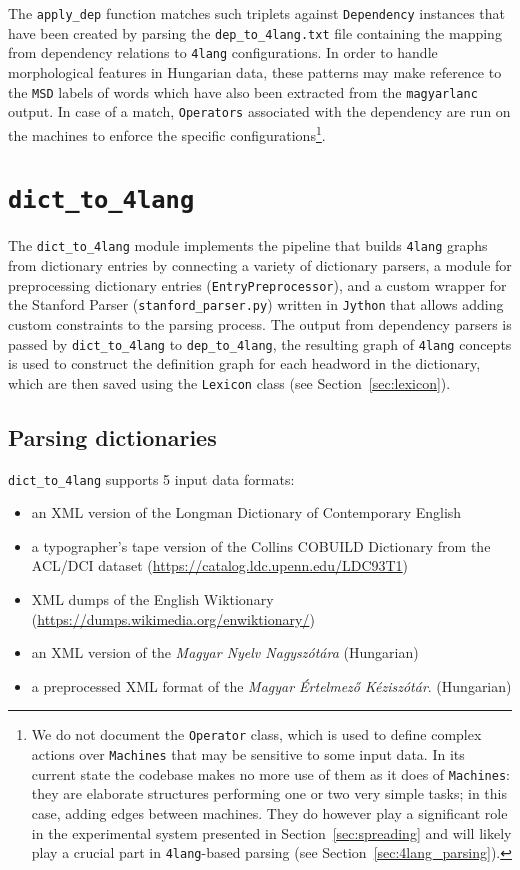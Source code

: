 \documentclass{article}
\newcommand{\defl}{\texttt{dep\_to\_4lang}\xspace}
\newcommand{\difl}{\texttt{dict\_to\_4lang}\xspace}
\newcommand{\fl}{\texttt{4lang}\xspace}
\begin{document}
The \texttt{apply\_dep} function matches such triplets against
\texttt{Dependency} instances that have been created by parsing the
\texttt{dep\_to\_4lang.txt} file containing the mapping from dependency relations
to \fl configurations. In order to handle morphological features in Hungarian
data, these patterns may make reference to the \texttt{MSD} labels of words
which have also been extracted from the \texttt{magyarlanc} output. In case of
a match, \texttt{Operators} associated with the dependency are run on the
machines to enforce the specific configurations\footnote{We do not document the
\texttt{Operator} class, which is used to define complex actions over
\texttt{Machines} that may be sensitive to some input data. In its current
state the codebase makes no more use of them as it does of \texttt{Machines}:
they are elaborate structures performing one or two very simple
tasks; in this case, adding edges between machines. They do however play a
significant role in the experimental system presented in
Section~\ref{sec:spreading} and will likely play a crucial part in \fl-based
parsing (see Section~\ref{sec:4lang_parsing}).}. 

\section{\difl}
\label{sec:difl}

The \difl module implements the pipeline that builds \fl graphs from
dictionary entries by connecting a variety of dictionary parsers, a module for
preprocessing dictionary entries (\texttt{EntryPreprocessor}), and a custom
wrapper for the Stanford Parser (\texttt{stanford\_parser.py}) written in
\texttt{Jython} that allows adding custom constraints to the parsing process.
The output from dependency parsers is passed by \difl to \defl, the resulting
graph of \fl concepts is used to construct the definition graph for each
headword in the dictionary, which are then saved using the \texttt{Lexicon}
class (see Section~\ref{sec:lexicon}).

\subsection{Parsing dictionaries}
\difl supports 5 input data formats:
\begin{itemize}
    \item an XML version of the Longman Dictionary of Contemporary English
    \item a typographer's tape version of the Collins COBUILD Dictionary
        from the ACL/DCI dataset (\url{https://catalog.ldc.upenn.edu/LDC93T1})
    \item XML dumps of the English Wiktionary (\url{https://dumps.wikimedia.org/enwiktionary/})
    \item an XML version of the \textit{Magyar Nyelv Nagysz\'ot\'ara}
        (Hungarian)
    \item a preprocessed XML format of the \textit{Magyar \'Ertelmez\H o
        K\'ezisz\'ot\'ar}. (Hungarian)
\end{itemize}
        
\end{document}
